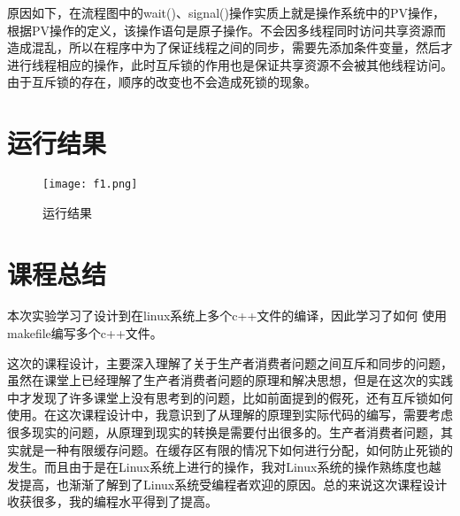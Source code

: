 \documentclass[withoutpreface,bwprint]{cumcmthesis} %
\begin{document}
原因如下，在流程图中的wait()、signal()操作实质上就是操作系统中的PV操作，根据PV操作的定义，该操作语句是原子操作。不会因多线程同时访问共享资源而造成混乱，所以在程序中为了保证线程之间的同步，需要先添加条件变量，然后才进行线程相应的操作，此时互斥锁的作用也是保证共享资源不会被其他线程访问。由于互斥锁的存在，顺序的改变也不会造成死锁的现象。

\section{运行结果}

\begin{figure}[H]
	\centering
	\texttt{[image: f1.png]}
	\caption{ 运行结果 \label{fig:1}}
\end{figure}

\section{课程总结}
本次实验学习了设计到在linux系统上多个c++文件的编译，因此学习了如何
使用makefile编写多个c++文件。

这次的课程设计，主要深入理解了关于生产者消费者问题之间互斥和同步的问题，虽然在课堂上已经理解了生产者消费者问题的原理和解决思想，但是在这次的实践中才发现了许多课堂上没有思考到的问题，比如前面提到的假死，还有互斥锁如何使用。在这次课程设计中，我意识到了从理解的原理到实际代码的编写，需要考虑很多现实的问题，从原理到现实的转换是需要付出很多的。生产者消费者问题，其实就是一种有限缓存问题。在缓存区有限的情况下如何进行分配，如何防止死锁的发生。而且由于是在Linux系统上进行的操作，我对Linux系统的操作熟练度也越发提高，也渐渐了解到了Linux系统受编程者欢迎的原因。总的来说这次课程设计收获很多，我的编程水平得到了提高。
\end{document}

